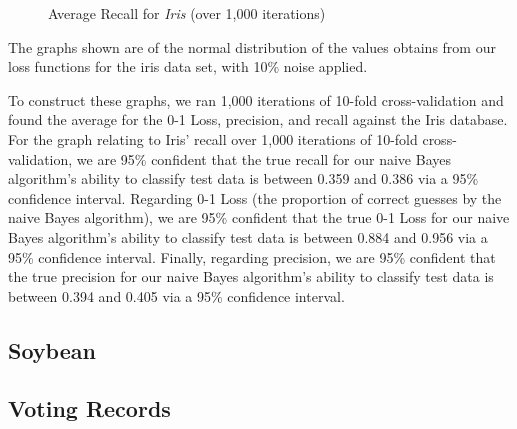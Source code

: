 \documentclass[twoside,11pt]{article}
\begin{document}
\begin{figure}[!hbp]
\begin{minipage}[b]{0.4\textwidth}
        \caption{Average Recall for \emph{Iris} (over 1,000 iterations)}
    \end{minipage}
\end{figure}

The graphs shown are of the normal distribution of the values obtains from our loss functions for the iris data set, with 10\% noise applied. 

To construct these graphs, we ran 1,000 iterations of 10-fold cross-validation and found the average for the 0-1 Loss, precision, and recall against the Iris database. For the graph relating to Iris' recall over 1,000 iterations of 10-fold cross-validation, we are 95\% confident that the true recall for our naive Bayes algorithm's ability to classify test data is between 0.359 and 0.386 via a 95\% confidence interval. Regarding 0-1 Loss (the proportion of correct guesses by the naive Bayes algorithm), we are 95\% confident that the true 0-1 Loss for our naive Bayes algorithm's ability to classify test data is between 0.884 and 0.956 via a 95\% confidence interval. Finally, regarding precision, we are 95\% confident that the true precision for our naive Bayes algorithm's ability to classify test data is between 0.394 and 0.405 via a 95\% confidence interval.

\subsection{Soybean}
\subsection{Voting Records}

\end{document}
